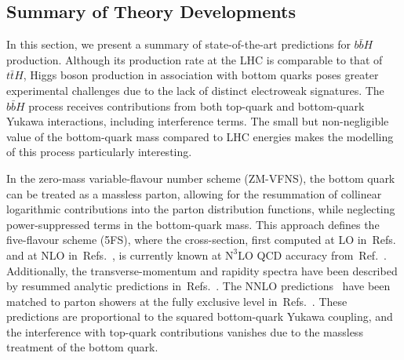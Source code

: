 \newcommand{\bbH}{$b\bar{b}H$}
\newcommand{\citere}[1]{Ref.~\cite{#1}}
\newcommand{\citeres}[1]{Refs.~\cite{#1}}
\newcommand{\tab}[1]{Table~\ref{#1}}
\newcommand{\nnnlo}{$\text{N}^3\text{LO}$}
\newcommand{\noun}[1]{{\scshape #1}}
\newcommand{\minnlo}{{\noun{MiNNLO$_{\textrm{PS}}$}}}
\newcommand{\nlonnllpart}{NLO+NNLL\textsubscript{part}+$y_by_t$}
\newcommand{\nlonnllpartnointf}{NLO+NNLL\textsubscript{part}}

\subsection{Summary of Theory Developments}

In this section, we present a summary of state-of-the-art predictions for \bbH{} production. Although its production rate at the LHC is comparable to that of $t\bar{t}H$, Higgs boson production in association with bottom quarks poses greater experimental challenges due to the lack of distinct electroweak signatures. The \bbH{} process receives contributions from both top-quark and bottom-quark Yukawa interactions, including interference terms. The small but non-negligible value of the bottom-quark mass compared to LHC energies makes the modelling of this process particularly interesting.

In the zero-mass variable-flavour number scheme (ZM-VFNS), the bottom quark can be treated as a massless parton, allowing for the resummation of collinear logarithmic contributions into the parton distribution functions, while neglecting power-suppressed terms in the bottom-quark mass. This approach defines the five-flavour scheme (5FS), where the cross-section, first computed at LO in~\citeres{Barnett:1987jw,Dicus:1988cx} and at NLO in~\citeres{Dicus:1998hs,Balazs:1998sb}, is currently known at \nnnlo{} QCD accuracy from~\citere{Duhr:2019kwi}. Additionally, the transverse-momentum and rapidity spectra have been described by resummed analytic predictions in~\citeres{Cal:2023mib,Das:2024pac}. The NNLO predictions~\cite{Harlander:2003ai} have been matched to parton showers at the fully exclusive level in~\citeres{Biello:2024vdh,Gavardi:2025zpf}. These predictions are proportional to the squared bottom-quark Yukawa coupling, and the interference with top-quark contributions vanishes due to the massless treatment of the bottom quark.

